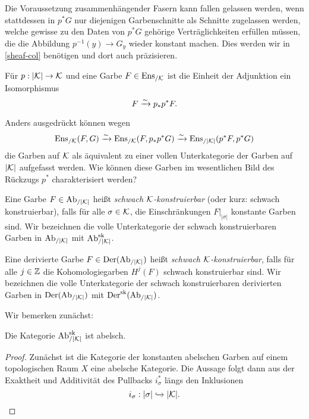 \begin{bem} \label{connected-fibers-subst}
  Die Voraussetzung zusammenhängender Fasern kann fallen gelassen
  werden, wenn stattdessen in $p^* G$ nur diejenigen Garbenschnitte
  als Schnitte zugelassen werden, welche gewisse zu den Daten von $p^*
  G$ gehörige Verträglichkeiten erfüllen müssen, die die Abbildung
  $p^{-1}(y) \to G_y$ wieder konstant machen. Dies werden wir in
  \ref{sheaf-col} benötigen und dort auch präzisieren.
\end{bem}
\begin{kor} \label{unit-iso}
  Für $p: |\mathcal{K}| \to \mathcal{K}$ und eine Garbe $F \in \operatorname{Ens}_{/\mathcal{K}}$ ist die
  Einheit der Adjunktion ein Isomorphismus
  \[ F \xrightarrow[]{\sim} p_* p^* F . \]
\end{kor}
Anders ausgedrückt können wegen
\[ \operatorname{Ens}_{/\mathcal{K}}(F, G) \xrightarrow[]{\sim} \operatorname{Ens}_{/\mathcal{K}}(F, p_* p^* G)
\xrightarrow[]{\sim} \operatorname{Ens}_{/|\mathcal{K}|}(p^* F, p^* G)
\]
die Garben auf $\mathcal{K}$ als äquivalent zu einer vollen Unterkategorie der
Garben auf $|\mathcal{K}|$ aufgefasst werden. Wie können diese Garben im
wesentlichen Bild des Rückzugs $p^*$ charakterisiert werden?
\begin{defn}
  Eine Garbe $F \in \operatorname{Ab}_{/|\mathcal{K}|}$ heißt \emph{schwach $\mathcal{K}$-konstruierbar}
  (oder kurz: schwach konstruierbar), falls für alle $\sigma \in \mathcal{K}$,
  die Einschränkungen $F|_{|\sigma|}$ konstante Garben sind. Wir
  bezeichnen die volle Unterkategorie der schwach konstruierbaren
  Garben in $\operatorname{Ab}_{/|\mathcal{K}|}$ mit $\operatorname{Ab}_{/|\mathcal{K}|}^{\operatorname{sk}}$.

  Eine derivierte Garbe $F \in \operatorname{Der}(\operatorname{Ab}_{/|\mathcal{K}|})$ heißt \emph{schwach
    $\mathcal{K}$-konstruierbar}, falls für alle $j \in \mathbb{Z}$ die
  Kohomologiegarben $H^j(F)$ schwach konstruierbar sind. Wir
  bezeichnen die volle Unterkategorie der schwach konstruierbaren
  derivierten Garben in $\operatorname{Der}(\operatorname{Ab}_{/|\mathcal{K}|})$ mit $\operatorname{Der}^{\operatorname{sk}}(\operatorname{Ab}_{/|\mathcal{K}|})$.
\end{defn}

Wir bemerken zunächst:
\begin{lemma}[\cite{KS}, 8.1.3] \label{skons-abelian}
  Die Kategorie $\operatorname{Ab}_{/|\mathcal{K}|}^{\operatorname{sk}}$ ist abelsch.
\end{lemma}
\begin{proof}
  Zunächst ist die Kategorie der konstanten abelschen Garben auf einem
  topologischen Raum $X$ eine abelsche Kategorie. Die Aussage folgt
  dann aus der Exaktheit und Additivität des Pullbacks $i_{\sigma}^*$
  längs den Inklusionen
  \[ i_{\sigma}: |\sigma| \xhookrightarrow{} |\mathcal{K}| . \]
\end{proof}

